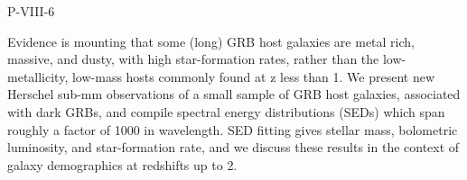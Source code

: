 P-VIII-6


\bigskip



\bigskip

\noindent Evidence is mounting that some (long) GRB host galaxies are metal rich, massive, and dusty, with high star-formation rates, rather than the low-metallicity, low-mass hosts commonly found at z less than 1. We present new Herschel sub-mm observations of a small sample of GRB host galaxies, associated with dark GRBs, and compile spectral energy distributions (SEDs) which span roughly
a factor of 1000 in wavelength.  SED fitting gives stellar mass, bolometric
luminosity, and star-formation rate, and we discuss these results in the
context of galaxy demographics at redshifts up to 2.

